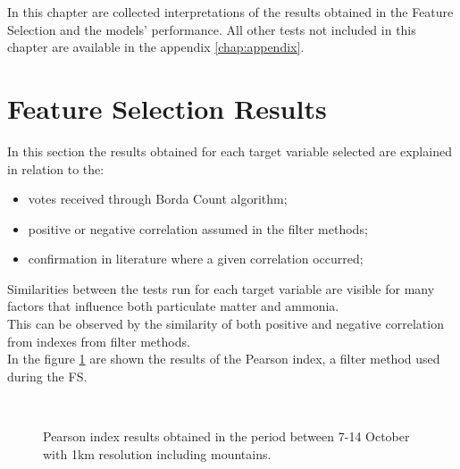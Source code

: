 In this chapter are collected interpretations of the results obtained in the Feature Selection and the models' performance. All other tests not included in this chapter are available in the appendix \ref{chap:appendix}.
\\
\section{Feature Selection Results}
In this section the results obtained for each target variable selected are explained in relation to the:
\begin{itemize}
    \item votes received through Borda Count algorithm;
    \item positive or negative correlation assumed in the filter methods;
    \item confirmation in literature where a given correlation occurred; 
\end{itemize}
Similarities between the tests run for each target variable are visible for many factors that influence both particulate matter and ammonia.\\
This can be observed by the similarity of both positive and negative correlation from indexes from filter methods. \\
In the figure \ref{fig:pearson_general} are shown the results of the Pearson index, a filter method used during the FS. 
\begin{figure}[H]
\centering
{}\\
\caption{Pearson index results obtained in the period between 7-14 October with 1km resolution including mountains.}
\label{fig:pearson_general}
\end{figure}
